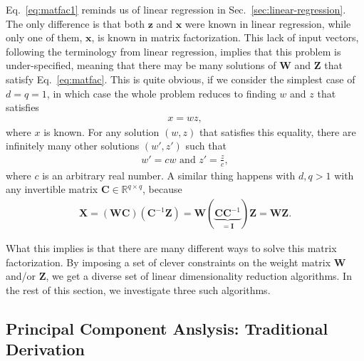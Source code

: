 \documentclass{report}
\newcommand{\vect}[1]{\mathbf{#1}}
\newcommand{\matr}[1]{\mathbf{#1}}
\newcommand{\vx}[0]{\vect{x}}
\newcommand{\vz}[0]{\vect{z}}
\newcommand{\mW}[0]{\matr{W}}
\newcommand{\mZ}[0]{\matr{Z}}
\newcommand{\mX}[0]{\matr{X}}
\newcommand{\mC}{\matr{C}}
\newcommand{\mI}{\matr{I}}
\newcommand{\RR}[0]{\mathbb{R}}
\begin{document}
Eq.~\eqref{eq:matfac1} reminds us of linear regression in
Sec.~\ref{sec:linear-regression}. The only difference is that both $\vz$ and
$\vx$ were known in linear regression, while only one of them, $\vx$, is known
in matrix factorization. This lack of input vectors, following the terminology
from linear regression, implies that this problem is under-specified, meaning
that there may be many solutions of $\mW$ and $\mZ$ that satisfy
Eq.~\eqref{eq:matfac}. This is quite obvious, if we consider the simplest case
of $d=q=1$, in which case the whole problem reduces to finding $w$ and $z$ that
satisfies
\begin{align*}
    x = w z,
\end{align*}
where $x$ is known. For any solution $(w, z)$ that satisfies this equality,
there are infinitely many other solutions $(w', z')$ such that
\begin{align*}
    w' = cw\text{ and }
    z' = \frac{z}{c},
\end{align*}
where $c$ is an arbitrary real number. A similar thing happens with $d, q > 1$
with any invertible matrix $\mC \in \RR^{q \times q}$, because
\begin{align*}
    \mX = (\mW \mC)(\mC^{-1} \mZ) = \mW (\underbrace{\mC \mC^{-1}}_{=\mI}) \mZ = \mW \mZ.
\end{align*}

What this implies is that there are many different ways to solve this matrix
factorization. By imposing a set of clever constraints on the weight matrix
$\mW$ and/or $\mZ$, we get a diverse set of linear dimensionality reduction
algorithms. In the rest of this section, we investigate three such algorithms. 


\subsection{Principal Component Anslysis: Traditional Derivation}
\label{sec:pca}
\end{document}
